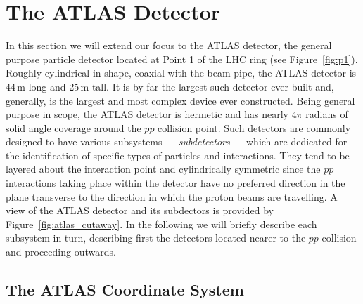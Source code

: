 \section{The ATLAS Detector}
\label{sec:atlas}

In this section we will extend our focus to the ATLAS detector, the general purpose
particle detector located at Point 1 of the LHC ring (see Figure~\ref{fig:p1}).
Roughly cylindrical in shape, coaxial with the beam-pipe,
the ATLAS detector is 44\,m long and 25\,m tall.
It is by far the largest such detector ever built and,
generally, is the largest and most complex device ever constructed.
Being general purpose in scope, the ATLAS detector is hermetic and has
nearly $4\pi$ radians of solid angle coverage around the $pp$ collision
point. 
Such detectors are commonly designed to have various subsystems --- \textit{subdetectors} ---
which are dedicated for the identification of specific types of particles
and interactions.
They tend to be layered about the interaction point and cylindrically symmetric
since the $pp$ interactions taking place within the detector have no preferred
direction in the plane transverse to the direction in which the proton beams
are travelling.
A view of the ATLAS detector and its subdectors is provided by Figure~\ref{fig:atlas_cutaway}.
In the following we will briefly describe each subsystem in turn, describing
first the detectors located nearer to the $pp$ collision and proceeding outwards.

\subsection{The ATLAS Coordinate System}
\label{sec:atlas_coordinate_system}

